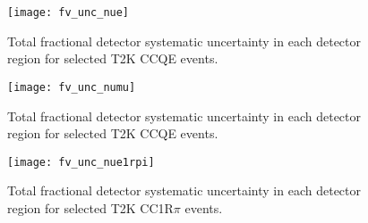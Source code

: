 \begin{figure}[h]
  \begin{center}
    \texttt{[image: fv\_unc\_nue]}
  \end{center}
  \caption{Total fractional detector systematic uncertainty in each detector region for selected
  T2K \nue CCQE events.}
  \label{fig:fverrnue}
\end{figure}

\begin{figure}[h]
  \begin{center}
    \texttt{[image: fv\_unc\_numu]}
  \end{center}
  \caption{Total fractional detector systematic uncertainty in each detector region for selected
  T2K \numu CCQE events.}
  \label{fig:fverrnumu}
\end{figure}

\begin{figure}[h]
  \begin{center}
    \texttt{[image: fv\_unc\_nue1rpi]}
  \end{center}
  \caption{Total fractional detector systematic uncertainty in each detector region for selected
  T2K \nue CC1R$\pi$ events.}
  \label{fig:fverrnue1rpi}
\end{figure}

